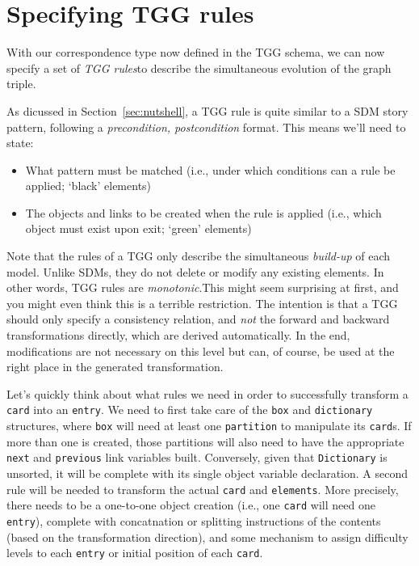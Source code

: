 \newpage
\hypertarget{sec:Rules}{}
\section{Specifying TGG rules}
\genHeader

With our correspondence type now defined in the TGG schema, we can now specify a set of \emph{TGG rules}to describe the simultaneous
evolution of the graph triple.

As dicussed in Section~\ref{sec:nutshell}, a TGG rule is quite similar to a SDM story pattern, following a \emph{precondition, postcondition}
format. This means we'll need to state:
\begin{itemize}
  \item What pattern must be matched (i.e., under which conditions can a rule be applied; `black' elements)
  \item The objects and links to be created when the rule is applied (i.e., which object must exist upon exit; `green' elements)
\end{itemize}

\vspace{0.5cm}

Note that the rules of a TGG only describe the simultaneous \emph{build-up} of each model. Unlike SDMs, they do not delete or modify any existing elements.
In other words, TGG rules are \emph{monotonic}.This might seem surprising at first, and you might even think this is a terrible restriction.
The intention is that a TGG should only specify a consistency relation, and \emph{not} the forward and backward transformations directly, which are derived
automatically. In the end, modifications are not necessary on this level but can, of course, be used at the right place in the generated transformation.

Let's quickly think about what rules we need in order to successfully transform a \texttt{card} into an \texttt{entry}. We need to first take care of the
\texttt{box} and \texttt{dictionary} structures, where \texttt{box} will need at least one \texttt{partition} to manipulate its \texttt{card}s. If more than one
is created, those partitions will also need to have the appropriate \texttt{next} and \texttt{previous} link variables built. Conversely, given that
\texttt{Dictionary} is unsorted, it will be complete with its single object variable declaration. A second rule will be needed to transform the actual
\texttt{card} and \texttt{elements}. More precisely, there needs to be a one-to-one object creation (i.e., one \texttt{card} will need one \texttt{entry}),
complete with concatnation or splitting instructions of the contents (based on the transformation direction), and some mechanism to assign difficulty levels to
each \texttt{entry} or initial position of each \texttt{card}.







